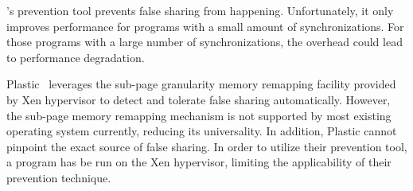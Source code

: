 \Sheriff{}'s prevention tool prevents false sharing from happening. Unfortunately, it only improves performance for programs with a small amount of synchronizations. 
For those programs with a large number of synchronizations, the overhead could lead to performance degradation.

Plastic~\cite{OSdetection} leverages the sub-page granularity memory remapping facility
provided by Xen hypervisor to detect and tolerate false sharing automatically.
However, the sub-page memory remapping mechanism is not supported by most existing operating system currently, reducing its universality. In addition, Plastic cannot pinpoint the exact source of false sharing.  
In order to utilize their prevention tool, a program has be run on the Xen hypervisor, limiting the applicability of their prevention technique.
